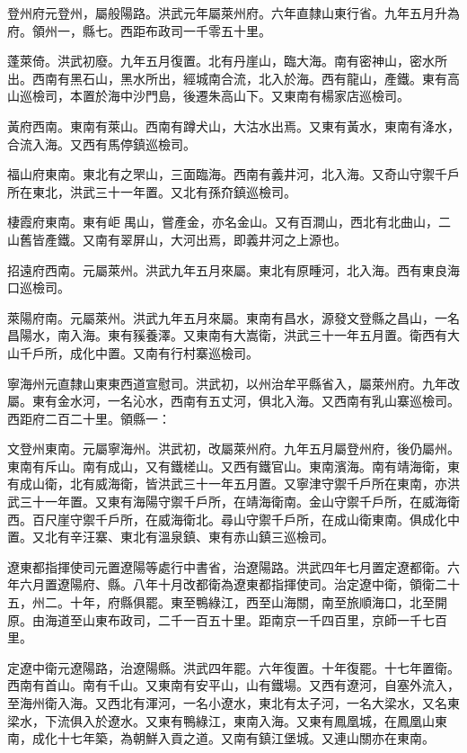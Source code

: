 登州府元登州，屬般陽路。洪武元年屬萊州府。六年直隸山東行省。九年五月升為府。領州一，縣七。西距布政司一千零五十里。

蓬萊倚。洪武初廢。九年五月復置。北有丹崖山，臨大海。南有密神山，密水所出。西南有黑石山，黑水所出，經城南合流，北入於海。西有龍山，產鐵。東有高山巡檢司，本置於海中沙門島，後遷朱高山下。又東南有楊家店巡檢司。

黃府西南。東南有萊山。西南有蹲犬山，大沽水出焉。又東有黃水，東南有洚水，合流入海。又西有馬停鎮巡檢司。

福山府東南。東北有之罘山，三面臨海。西南有義井河，北入海。又奇山守禦千戶所在東北，洪武三十一年置。又北有孫夼鎮巡檢司。

棲霞府東南。東有岠禺山，嘗產金，亦名金山。又有百澗山，西北有北曲山，二山舊皆產鐵。又南有翠屏山，大河出焉，即義井河之上源也。

招遠府西南。元屬萊州。洪武九年五月來屬。東北有原畽河，北入海。西有東良海口巡檢司。

萊陽府南。元屬萊州。洪武九年五月來屬。東南有昌水，源發文登縣之昌山，一名昌陽水，南入海。東有豯養澤。又東南有大嵩衛，洪武三十一年五月置。衛西有大山千戶所，成化中置。又南有行村寨巡檢司。

寧海州元直隸山東東西道宣慰司。洪武初，以州治牟平縣省入，屬萊州府。九年改屬。東有金水河，一名沁水，西南有五丈河，俱北入海。又西南有乳山寨巡檢司。西距府二百二十里。領縣一：

文登州東南。元屬寧海州。洪武初，改屬萊州府。九年五月屬登州府，後仍屬州。東南有斥山。南有成山，又有鐵槎山。又西有鐵官山。東南濱海。南有靖海衛，東有成山衛，北有威海衛，皆洪武三十一年五月置。又寧津守禦千戶所在東南，亦洪武三十一年置。又東有海陽守禦千戶所，在靖海衛南。金山守禦千戶所，在威海衛西。百尺崖守禦千戶所，在威海衛北。尋山守禦千戶所，在成山衛東南。俱成化中置。又北有辛汪寨、東北有溫泉鎮、東有赤山鎮三巡檢司。

遼東都指揮使司元置遼陽等處行中書省，治遼陽路。洪武四年七月置定遼都衛。六年六月置遼陽府、縣。八年十月改都衛為遼東都指揮使司。治定遼中衛，領衛二十五，州二。十年，府縣俱罷。東至鴨綠江，西至山海關，南至旅順海口，北至開原。由海道至山東布政司，二千一百五十里。距南京一千四百里，京師一千七百里。

定遼中衛元遼陽路，治遼陽縣。洪武四年罷。六年復置。十年復罷。十七年置衛。西南有首山。南有千山。又東南有安平山，山有鐵場。又西有遼河，自塞外流入，至海州衛入海。又西北有渾河，一名小遼水，東北有太子河，一名大梁水，又名東梁水，下流俱入於遼水。又東有鴨綠江，東南入海。又東有鳳凰城，在鳳凰山東南，成化十七年築，為朝鮮入貢之道。又南有鎮江堡城。又連山關亦在東南。

